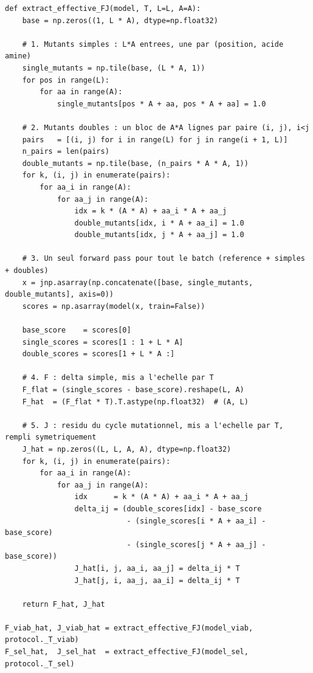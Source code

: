 \documentclass[11pt,a4paper]{article}
\begin{document}
\begin{lstlisting}
def extract_effective_FJ(model, T, L=L, A=A):
    base = np.zeros((1, L * A), dtype=np.float32)

    # 1. Mutants simples : L*A entrees, une par (position, acide amine)
    single_mutants = np.tile(base, (L * A, 1))
    for pos in range(L):
        for aa in range(A):
            single_mutants[pos * A + aa, pos * A + aa] = 1.0

    # 2. Mutants doubles : un bloc de A*A lignes par paire (i, j), i<j
    pairs   = [(i, j) for i in range(L) for j in range(i + 1, L)]
    n_pairs = len(pairs)
    double_mutants = np.tile(base, (n_pairs * A * A, 1))
    for k, (i, j) in enumerate(pairs):
        for aa_i in range(A):
            for aa_j in range(A):
                idx = k * (A * A) + aa_i * A + aa_j
                double_mutants[idx, i * A + aa_i] = 1.0
                double_mutants[idx, j * A + aa_j] = 1.0

    # 3. Un seul forward pass pour tout le batch (reference + simples + doubles)
    x = jnp.asarray(np.concatenate([base, single_mutants, double_mutants], axis=0))
    scores = np.asarray(model(x, train=False))

    base_score    = scores[0]
    single_scores = scores[1 : 1 + L * A]
    double_scores = scores[1 + L * A :]

    # 4. F : delta simple, mis a l'echelle par T
    F_flat = (single_scores - base_score).reshape(L, A)
    F_hat  = (F_flat * T).T.astype(np.float32)  # (A, L)

    # 5. J : residu du cycle mutationnel, mis a l'echelle par T, rempli symetriquement
    J_hat = np.zeros((L, L, A, A), dtype=np.float32)
    for k, (i, j) in enumerate(pairs):
        for aa_i in range(A):
            for aa_j in range(A):
                idx      = k * (A * A) + aa_i * A + aa_j
                delta_ij = (double_scores[idx] - base_score
                            - (single_scores[i * A + aa_i] - base_score)
                            - (single_scores[j * A + aa_j] - base_score))
                J_hat[i, j, aa_i, aa_j] = delta_ij * T
                J_hat[j, i, aa_j, aa_i] = delta_ij * T

    return F_hat, J_hat

F_viab_hat, J_viab_hat = extract_effective_FJ(model_viab, protocol._T_viab)
F_sel_hat,  J_sel_hat  = extract_effective_FJ(model_sel,  protocol._T_sel)
\end{lstlisting}
\end{document}
